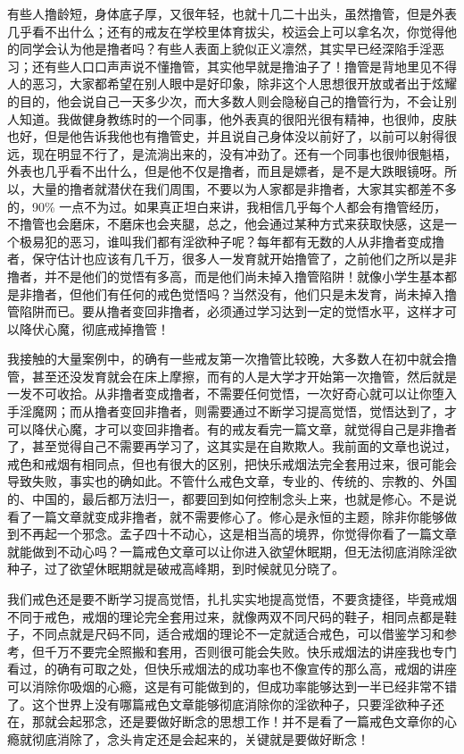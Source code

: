 \begin{case}
    有些人撸龄短，身体底子厚，又很年轻，也就十几二十出头，虽然撸管，但是外表几乎看不出什么；还有的戒友在学校里体育拔尖，校运会上可以拿名次，你觉得他的同学会认为他是撸者吗？有些人表面上貌似正义凛然，其实早已经深陷手淫恶习；还有些人口口声声说不懂撸管，其实他早就是撸油子了！撸管是背地里见不得人的恶习，大家都希望在别人眼中是好印象，除非这个人思想很开放或者出于炫耀的目的，他会说自己一天多少次，而大多数人则会隐秘自己的撸管行为，不会让别人知道。我做健身教练时的一个同事，他外表真的很阳光很有精神，也很帅，皮肤也好，但是他告诉我他也有撸管史，并且说自己身体没以前好了，以前可以射得很远，现在明显不行了，是流淌出来的，没有冲劲了。还有一个同事也很帅很魁梧，外表也几乎看不出什么，但是他不仅是撸者，而且是嫖者，是不是大跌眼镜呀。所以，大量的撸者就潜伏在我们周围，不要以为人家都是非撸者，大家其实都差不多的，90\% 一点不为过。如果真正坦白来讲，我相信几乎每个人都会有撸管经历，不撸管也会磨床，不磨床也会夹腿，总之，他会通过某种方式来获取快感，这是一个极易犯的恶习，谁叫我们都有淫欲种子呢？每年都有无数的人从非撸者变成撸者，保守估计也应该有几千万，很多人一发育就开始撸管了，之前他们之所以是非撸者，并不是他们的觉悟有多高，而是他们尚未掉入撸管陷阱！就像小学生基本都是非撸者，但他们有任何的戒色觉悟吗？当然没有，他们只是未发育，尚未掉入撸管陷阱而已。要从撸者变回非撸者，必须通过学习达到一定的觉悟水平，这样才可以降伏心魔，彻底戒掉撸管！

    我接触的大量案例中，的确有一些戒友第一次撸管比较晚，大多数人在初中就会撸管，甚至还没发育就会在床上摩擦，而有的人是大学才开始第一次撸管，然后就是一发不可收拾。从非撸者变成撸者，不需要任何觉悟，一次好奇心就可以让你堕入手淫魔网；而从撸者变回非撸者，则需要通过不断学习提高觉悟，觉悟达到了，才可以降伏心魔，才可以变回非撸者。有的戒友看完一篇文章，就觉得自己是非撸者了，甚至觉得自己不需要再学习了，这其实是在自欺欺人。我前面的文章也说过，戒色和戒烟有相同点，但也有很大的区别，把快乐戒烟法完全套用过来，很可能会导致失败，事实也的确如此。不管什么戒色文章，专业的、传统的、宗教的、外国的、中国的，最后都万法归一，都要回到如何控制念头上来，也就是修心。不是说看了一篇文章就变成非撸者，就不需要修心了。修心是永恒的主题，除非你能够做到不再起一个邪念。孟子四十不动心，这是相当高的境界，你觉得你看了一篇文章就能做到不动心吗？一篇戒色文章可以让你进入欲望休眠期，但无法彻底消除淫欲种子，过了欲望休眠期就是破戒高峰期，到时候就见分晓了。

    我们戒色还是要不断学习提高觉悟，扎扎实实地提高觉悟，不要贪捷径，毕竟戒烟不同于戒色，戒烟的理论完全套用过来，就像两双不同尺码的鞋子，相同点都是鞋子，不同点就是尺码不同，适合戒烟的理论不一定就适合戒色，可以借鉴学习和参考，但千万不要完全照搬和套用，否则很可能会失败。快乐戒烟法的讲座我也专门看过，的确有可取之处，但快乐戒烟法的成功率也不像宣传的那么高，戒烟的讲座可以消除你吸烟的心瘾，这是有可能做到的，但成功率能够达到一半已经非常不错了。这个世界上没有哪篇戒色文章能够彻底消除你的淫欲种子，只要淫欲种子还在，那就会起邪念，还是要做好断念的思想工作！并不是看了一篇戒色文章你的心瘾就彻底消除了，念头肯定还是会起来的，关键就是要做好断念！


\end{case}
